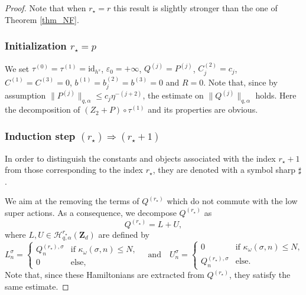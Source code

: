 \begin{proof}
Note that when $r_{\star}=r$ this result is slightly stronger than the one of Theorem \ref{thm_NF}.

\subsubsection*{Initialization $r_\star = p$}
We set $\tau^{(0)}=\tau^{(1)}=\mathrm{id}_{h^s}$, $\varepsilon_0= +\infty$, $Q^{(j)}=P^{(j)}$, $C_{j}^{(2)}=c_j$, $C^{(1)}=C^{(3)}=0$, $b^{(1)}=b_{j}^{(2)}=b^{(3)}=0$ and $R =0$. Note that, since by assumption $\| P^{(j)}\|_{q,\alpha} \leq c_j \eta^{-(j+2)}$, the estimate on $\| Q^{(j)}\|_{q,\alpha}$ holds. Here the decomposition of $(Z_2+P) \circ \tau^{(1)}$ and its properties are obvious.

\subsubsection*{Induction step $(r_\star) \Rightarrow (r_{\star}+1)$}
In order to distinguish the constants and objects associated with the index $r_{\star}+1$ from those corresponding to the index $r_{\star}$, they are denoted with a symbol sharp $\sharp$.

We aim at the removing the terms of $ Q^{(r_\star)}$ which do not commute with the low super actions. As a consequence, we decompose $Q^{(r_\star)}$ as
\[
Q^{(r_\star)} = L+U,
\]
where $L,U \in \mathscr{H}_{q,\alpha}^{r_\star}(\mathbf{Z}_d)$ are defined by
\[
L_n^\sigma = \begin{cases} Q^{(r_\star),\sigma}_n & \text{if } \kappa_\omega(\sigma,n) \leq N, \\
0 & \text{else},
\end{cases}
\quad\text{and} \quad U_n^\sigma = \begin{cases} 0 & \text{if } \kappa_\omega(\sigma,n) \leq N, \\
Q^{(r_\star),\sigma}_n & \text{else}.
\end{cases}
\]
Note that, since these Hamiltonians are extracted from $Q^{(r_\star)}$, they satisfy the same estimate.


\end{proof}
